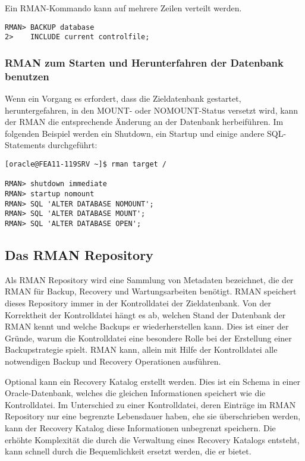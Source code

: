           Ein RMAN-Kommando kann auf mehrere Zeilen verteilt werden.
          \begin{lstlisting}[caption={Ein mehrzeiliges RMAN-Kommando},label=admin1004,language=rman]
RMAN> BACKUP database
2>    INCLUDE current controlfile;
          \end{lstlisting}
        \subsubsection{RMAN zum Starten und Herunterfahren der Datenbank benutzen}
          Wenn ein Vorgang es erfordert, dass die Zieldatenbank gestartet, heruntergefahren, in den MOUNT- oder NOMOUNT-Status versetzt wird, kann der RMAN die entsprechende Änderung an der Datenbank herbeiführen. Im folgenden Beispiel werden ein Shutdown, ein Startup und einige andere SQL-Statements durchgeführt:
          \begin{lstlisting}[caption={Startup und Shutdown im RMAN},label=admin1005,language=rman,alsolanguage=sqlplus]
[oracle@FEA11-119SRV ~]$ rman target /

RMAN> shutdown immediate
RMAN> startup nomount
RMAN> SQL 'ALTER DATABASE NOMOUNT';
RMAN> SQL 'ALTER DATABASE MOUNT';
RMAN> SQL 'ALTER DATABASE OPEN';
        \end{lstlisting}
      \subsection{Das RMAN Repository}
        Als RMAN Repository wird eine Sammlung von Metadaten bezeichnet, die der RMAN für Backup, Recovery und Wartungsarbeiten benötigt. RMAN speichert dieses Repository immer in der Kontrolldatei der Zieldatenbank. Von der Korrektheit der Kontrolldatei hängt es ab, welchen Stand der Datenbank der RMAN kennt und welche Backups er wiederherstellen kann. Dies ist einer der Gründe, warum die Kontrolldatei eine besondere Rolle bei der Erstellung einer Backupstrategie spielt. RMAN kann, allein mit Hilfe der Kontrolldatei alle notwendigen Backup und Recovery Operationen ausführen.

        Optional kann ein Recovery Katalog erstellt werden. Dies ist ein Schema in einer Oracle-Datenbank, welches die gleichen Informationen speichert wie die Kontrolldatei. Im Unterschied zu einer Kontrolldatei, deren Einträge im RMAN Repository nur eine begrenzte Lebensdauer haben, ehe sie überschrieben werden, kann der Recovery Katalog diese Informationen unbegrenzt speichern. Die erhöhte Komplexität die durch die Verwaltung eines Recovery Katalogs entsteht, kann schnell durch die Bequemlichkeit ersetzt werden, die er bietet.

